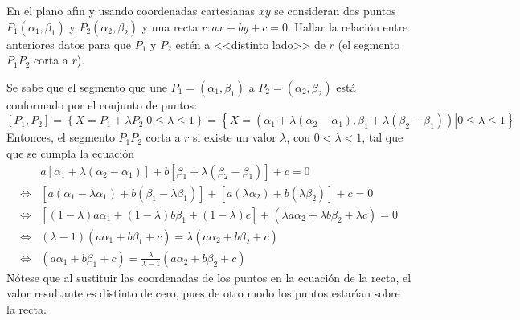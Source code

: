 \begin{enunciado}
 En el plano af\'{\i}n y usando coordenadas cartesianas $xy$
 se consideran dos puntos
 $P_1\left( \alpha_1, \beta_1 \right)$ y
 $P_2\left( \alpha_2, \beta_2 \right)$
 y una recta $r: ax + by + c = 0$.
 Hallar la relaci\'on entre anteriores datos
 para que $P_1$ y $P_2$ est\'en a <<distinto lado>> de $r$
 (el segmento $P_1P_2$ corta a $r$).
\end{enunciado}

\begin{solucion}
 Se sabe que el segmento que une $P_1 = \left( \alpha_1, \beta_1 \right)$
 a $P_2 = \left( \alpha_2, \beta_2 \right)$
 est\'a conformado por el conjunto de puntos:
 \begin{equation*}
  \left[ P_1,P_2 \right] =
  \left\{ \left. X = P_1 + \lambda P_2 \right|
  0 \leq \lambda \leq 1 \right\}
  = \left\{ \left. X = 
  \left( \alpha_1 + \lambda\left(\alpha_2 - \alpha_1 \right),
  \beta_1 + \lambda \left(\beta_2 -\beta_1 \right) \right)
  \right| 0\leq \lambda \leq 1
  \right\}
 \end{equation*}
 Entonces, el segmento $P_1P_2$ corta a $r$
 si existe un valor $\lambda$, con $0<\lambda<1$,
 tal que que se cumpla la ecuaci\'on
 \begin{align}
  &
  a\left[ \alpha_1 + \lambda\left( \alpha_2 - \alpha_1 \right) \right]
  + b\left[ \beta_1 + \lambda\left( \beta_2 - \beta_1 \right) \right]
  + c = 0 \label{eqn:1.1} \\
  \Leftrightarrow & 
  \left[a\left( \alpha_1 - \lambda\alpha_1 \right)
  + b\left( \beta_1 - \lambda\beta_1 \right)
  \right] 
  + \left[a\left( \lambda\alpha_2 \right)
  + b\left( \lambda\beta_2 \right)
  \right] + c = 0 \nonumber \\
  \Leftrightarrow &
  \left[ \left( 1 - \lambda \right)a\alpha_1 
  + \left( 1 - \lambda \right)b\beta_1 + \left(1-\lambda \right)c \right]
  + \left( \lambda a\alpha_2 + \lambda b\beta_2 + \lambda c \right)
  = 0 \nonumber \\
  \Leftrightarrow &
  \left( \lambda - 1 \right)\left( a\alpha_1 + b\beta_1 + c \right) =
  \lambda\left( a\alpha_2 + b\beta_2 + c \right) \nonumber \\
  \Leftrightarrow &
  \left( a\alpha_1 + b\beta_1 + c \right) = 
  \frac{\lambda}{\lambda - 1} \left( a\alpha_2 + b\beta_2 + c \right) \label{eqn:1.2}
 \end{align}
 N\'otese que al sustituir las coordenadas de los puntos en la ecuaci\'on
 de la recta, el valor resultante es distinto de cero, 
 pues de otro modo los puntos estar\'{\i}an sobre la recta.

\end{solucion}
